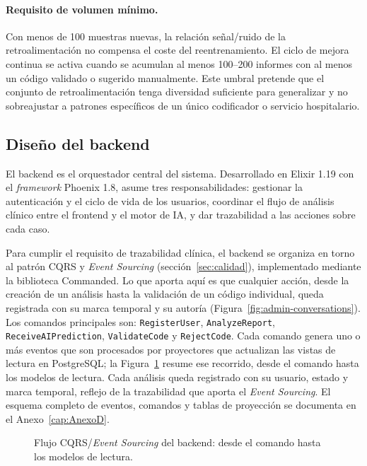 \paragraph{Requisito de volumen mínimo.}
Con menos de 100 muestras nuevas, la relación señal/ruido de la retroalimentación no compensa
el coste del reentrenamiento. El ciclo de mejora continua se activa cuando se acumulan
al menos 100--200 informes con al menos un código validado o sugerido manualmente.
Este umbral pretende que el conjunto de retroalimentación tenga diversidad suficiente para
generalizar y no sobreajustar a patrones específicos de un único codificador o servicio
hospitalario.

\subsection{Diseño del backend}
\label{sec:diseno-backend}

El backend es el orquestador central del sistema. Desarrollado en Elixir 1.19 con el \emph{framework} Phoenix 1.8, asume tres responsabilidades: gestionar la autenticación y el ciclo de vida de los usuarios, coordinar el flujo de análisis clínico entre el frontend y el motor de IA, y dar trazabilidad a las acciones sobre cada caso.

Para cumplir el requisito de trazabilidad clínica, el backend se organiza en torno al patrón CQRS y \emph{Event Sourcing} (sección~\ref{sec:calidad}), implementado mediante la biblioteca Commanded. Lo que aporta aquí es que cualquier acción, desde la creación de un análisis hasta la validación de un código individual, queda registrada con su marca temporal y su autoría (Figura~\ref{fig:admin-conversations}). Los comandos principales son: \texttt{RegisterUser}, \texttt{AnalyzeReport}, \texttt{ReceiveAIPrediction}, \texttt{ValidateCode} y \texttt{RejectCode}. Cada comando genera uno o más eventos que son procesados por proyectores que actualizan las vistas de lectura en PostgreSQL; la Figura~\ref{fig:cqrs-flujo} resume ese recorrido, desde el comando hasta los modelos de lectura. Cada análisis queda registrado con su usuario, estado y marca temporal, reflejo de la trazabilidad que aporta el \emph{Event Sourcing}. El esquema completo de eventos, comandos y tablas de proyección se documenta en el Anexo~\ref{cap:AnexoD}.

\begin{figure}[!t]
\centering
\resizebox{\textwidth}{!}{}
\caption{Flujo CQRS/\emph{Event Sourcing} del backend: desde el comando hasta los modelos de lectura.}
\label{fig:cqrs-flujo}
\end{figure}

